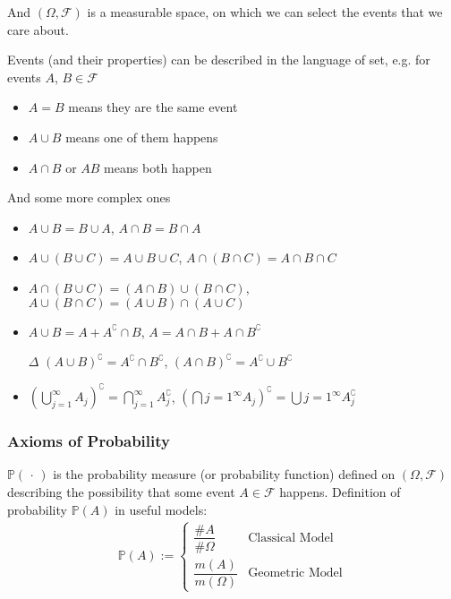     And $(\Omega,\mathscr{F})$ is a measurable space, on which we can select the events that we care about.

    Events (and their properties) can be described in the language of set, e.g. for events $ A $, $ B\in\mathscr{F} $
\begin{itemize}[topsep=2pt,itemsep=0pt]
    \item $ A=B $ means they are the same event
    \item $ A\cup B $ means one of them happens
    \item $ A\cap B $ or $ AB $ means both happen 
\end{itemize}

And some more complex ones
\begin{itemize}[topsep=2pt,itemsep=0pt]
    \item $ A\cup B=B\cup A $, $ A\cap B=B\cap A $
    \item $ A\cup (B\cup C)=A\cup B\cup C $, $ A\cap (B\cap C)=A\cap B\cap C $
    \item $ A\cap (B\cup C)=(A\cap B)\cup (B\cap C) $, $ A\cup (B \cap C)=(A\cup B)\cap (A\cup C) $
    \item $ A\cup B=A+ A^\complement\cap B $, $ A=A\cap B+A\cap B^\complement $
    \item[$ \Delta  $] $ (A\cup B)^\complement =A^\complement\cap B^\complement $, $ (A\cap B)^\complement = A^\complement \cup B^\complement  $
    \item $ (\bigcup_{j=1}^\infty A_j)^\complement =\bigcap_{j=1}^\infty A_j^\complement $, $ (\bigcap{j=1}^\infty A_j)^\complement =\bigcup{j=1}^\infty A_j^\complement $
\end{itemize}
    
\subsubsection{Axioms of Probability}

    $\mathbb{P}(\,\cdot\,)$ is the probability measure (or probability function) defined on $(\Omega,\mathscr{F})$ describing the possibility that some event $ A\in\mathscr{F}  $ happens. Definition of probability $ \mathbb{P}(A) $ in useful models:
    \begin{align}
       \mathbb{P}\left( A \right) :=\begin{cases}
            \dfrac{\#A}{\#\Omega }&\text{Classical Model}\\
            \dfrac{m(A)}{m(\Omega )}&\text{Geometric Model}
        \end{cases}   
    \end{align}
    
